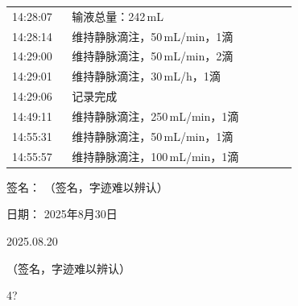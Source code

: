 \documentclass[UTF8,10pt,a4paper,fontset=fandol]{ctexart}
\newcommand{\fieldvalue}[1]{#1}
\newcommand{\handwritten}[1]{#1}
\begin{document}
\begin{tabular}{p{0.18\linewidth}p{0.68\linewidth}}
14:28:07 & \fieldvalue{输液总量：242\,mL} \\[2pt]
14:28:14 & \fieldvalue{维持静脉滴注，50\,mL/min，1滴} \\[2pt]
14:29:00 & \fieldvalue{维持静脉滴注，50\,mL/min，2滴} \\[2pt]
14:29:01 & \fieldvalue{维持静脉滴注，30\,mL/h，1滴} \\[2pt]
14:29:06 & \fieldvalue{记录完成} \\[2pt]
14:49:11 & \fieldvalue{维持静脉滴注，250\,mL/min，1滴} \\[2pt]
14:55:31 & \fieldvalue{维持静脉滴注，50\,mL/min，1滴} \\[2pt]
14:55:57 & \fieldvalue{维持静脉滴注，100\,mL/min，1滴} \\
\end{tabular}

\vfill

签名：%
\fieldvalue{\handwritten{（签名，字迹难以辨认）}}

\hspace{2em}日期：%
\fieldvalue{\handwritten{2025年8月30日}}

\vspace{1em}

\fieldvalue{\handwritten{2025.08.20}}

\hspace{2em}%
\fieldvalue{\handwritten{（签名，字迹难以辨认）}}

\vspace{1em}

\fieldvalue{\handwritten{4?}}
\end{document}
